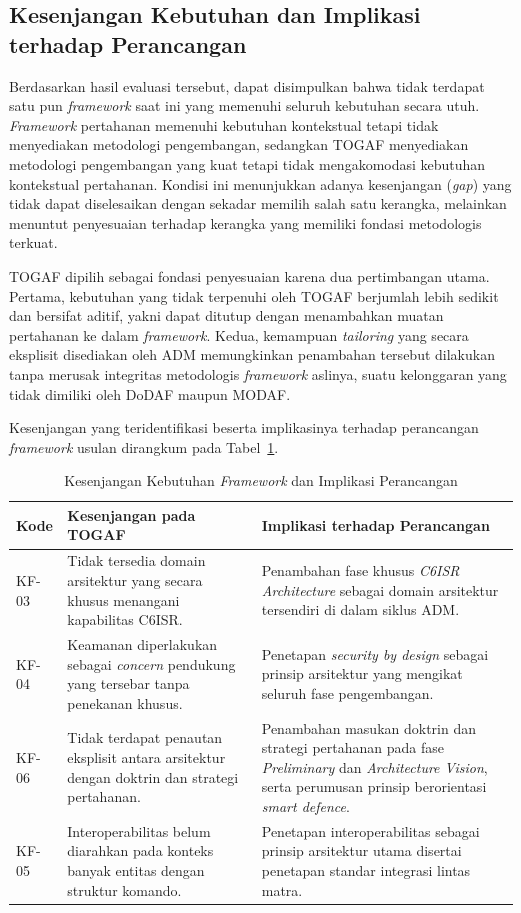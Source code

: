 \subsection{Kesenjangan Kebutuhan dan Implikasi terhadap Perancangan}

Berdasarkan hasil evaluasi tersebut, dapat disimpulkan bahwa tidak terdapat satu pun \textit{framework} saat ini yang memenuhi seluruh kebutuhan secara utuh. \textit{Framework} pertahanan memenuhi kebutuhan kontekstual tetapi tidak menyediakan metodologi pengembangan, sedangkan TOGAF menyediakan metodologi pengembangan yang kuat tetapi tidak mengakomodasi kebutuhan kontekstual pertahanan. Kondisi ini menunjukkan adanya kesenjangan (\textit{gap}) yang tidak dapat diselesaikan dengan sekadar memilih salah satu kerangka, melainkan menuntut penyesuaian terhadap kerangka yang memiliki fondasi metodologis terkuat.

TOGAF dipilih sebagai fondasi penyesuaian karena dua pertimbangan utama. Pertama, kebutuhan yang tidak terpenuhi oleh TOGAF berjumlah lebih sedikit dan bersifat aditif, yakni dapat ditutup dengan menambahkan muatan pertahanan ke dalam \textit{framework}. Kedua, kemampuan \textit{tailoring} yang secara eksplisit disediakan oleh ADM memungkinkan penambahan tersebut dilakukan tanpa merusak integritas metodologis \textit{framework} aslinya, suatu kelonggaran yang tidak dimiliki oleh DoDAF maupun MODAF.

Kesenjangan yang teridentifikasi beserta implikasinya terhadap perancangan \textit{framework} usulan dirangkum pada Tabel~\ref{tab:kesenjangan-framework}.

\begin{table}[htbp]
\caption{Kesenjangan Kebutuhan \textit{Framework} dan Implikasi Perancangan}
\label{tab:kesenjangan-framework}
\centering
\begin{tabular}{@{}p{}p{}p{}@{}}
\toprule
\textbf{Kode} & \textbf{Kesenjangan pada TOGAF} & \textbf{Implikasi terhadap Perancangan}\\
\midrule
KF-03 & Tidak tersedia domain arsitektur yang secara khusus menangani kapabilitas C6ISR. & Penambahan fase khusus \textit{C6ISR Architecture} sebagai domain arsitektur tersendiri di dalam siklus ADM.\\
\addlinespace
KF-04 & Keamanan diperlakukan sebagai \textit{concern} pendukung yang tersebar tanpa penekanan khusus. & Penetapan \textit{security by design} sebagai prinsip arsitektur yang mengikat seluruh fase pengembangan.\\
\addlinespace
KF-06 & Tidak terdapat penautan eksplisit antara arsitektur dengan doktrin dan strategi pertahanan. & Penambahan masukan doktrin dan strategi pertahanan pada fase \textit{Preliminary} dan \textit{Architecture Vision}, serta perumusan prinsip berorientasi \textit{smart defence}.\\
\addlinespace
KF-05 & Interoperabilitas belum diarahkan pada konteks banyak entitas dengan struktur komando. & Penetapan interoperabilitas sebagai prinsip arsitektur utama disertai penetapan standar integrasi lintas matra.\\
\bottomrule
\end{tabular}
\end{table}

